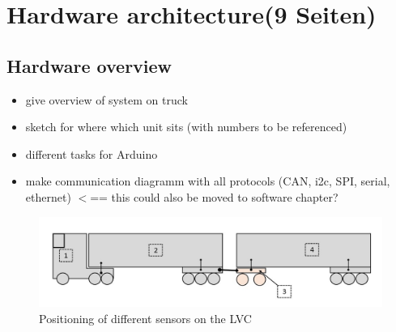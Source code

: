 \documentclass[ExampleMasters.tex]{subfiles}
\begin{document}
\clearpage


\chapter{Hardware architecture(9 Seiten)}
\label{chap:hardware_setup}

\section{Hardware overview}

\begin{itemize}
	\item give overview of system on truck
	\item sketch for where which unit sits (with numbers to be referenced)
	\item different tasks for Arduino
	\item make communication diagramm with all protocols (CAN, i2c, SPI, serial, ethernet) $<$== this could also be moved to software chapter?
	
\end{itemize}

\begin{figure}[ph]
\centering
\includegraphics[width=1\linewidth]{figures/combination_overview_with_positions}
\caption{Positioning of different sensors on the LVC}
\label{fig:combination_overview_with_positions}
\end{figure}
\end{document}
